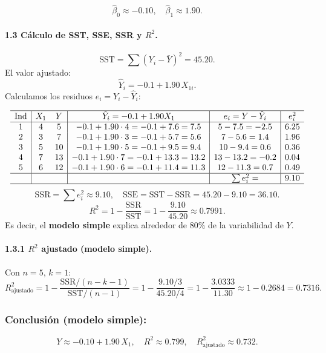 \documentclass[10pt,a4paper]{article}
\begin{document}
\begin{enumerate}
\[
\boxed{
\widehat{\beta}_0 \approx -0.10,
\quad
\widehat{\beta}_1 \approx 1.90.
}
\]

\paragraph{1.3 C\'alculo de SST, SSE, SSR y $R^2$.}

\[
\text{SST}
= \sum (Y_i - \bar{Y})^2
= 45.20.
\]
El valor ajustado: 
\[
\hat{Y}_i
= -0.1 +1.90\,X_{1i}.
\]
Calculamos los residuos $e_i = Y_i - \hat{Y}_i$:

\[
\begin{array}{c|cc|c|c|c}
\hline
\text{Ind} & X_1 & Y 
& \hat{Y}_i = -0.1 +1.90X_1
& e_i= Y-\hat{Y}_i
& e_i^2
\\\hline
1 & 4 & 5 
& -0.1 +1.90\cdot4 =-0.1 +7.6=7.5
& 5-7.5=-2.5
& 6.25
\\
2 & 3 &7
& -0.1 +1.90\cdot3 =-0.1 +5.7=5.6
& 7-5.6=1.4
& 1.96
\\
3 & 5 &10
& -0.1 +1.90\cdot5 =-0.1 +9.5=9.4
& 10-9.4=0.6
& 0.36
\\
4 & 7 &13
& -0.1 +1.90\cdot7 =-0.1 +13.3=13.2
& 13-13.2=-0.2
& 0.04
\\
5 & 6 &12
& -0.1 +1.90\cdot6 =-0.1 +11.4=11.3
& 12-11.3=0.7
& 0.49
\\
\hline
& & & & \sum e_i^2= & 9.10
\\\hline
\end{array}
\]
\[
\text{SSR} = \sum e_i^2 \approx 9.10,
\quad
\text{SSE} = \text{SST} - \text{SSR} = 45.20 -9.10=36.10.
\]
\[
R^2
= 1 - \frac{\text{SSR}}{\text{SST}}
= 1 - \frac{9.10}{45.20}
\approx 0.7991.
\]
Es decir, el \textbf{modelo simple} explica alrededor de $80\%$ de la variabilidad de $Y$.

\paragraph{1.3.1 $R^2$ ajustado (modelo simple).}

Con $n=5$, $k=1$:
\[
R_{\text{ajustado}}^2
= 1 - \frac{\text{SSR}/(n - k -1)}{\text{SST}/(n-1)}
= 1 - \frac{9.10/3}{45.20/4}
= 1 - \frac{3.0333}{11.30}
\approx 1 -0.2684
= 0.7316.
\]

\subsubsection*{Conclusi\'on (modelo simple):}
\[
Y \approx -0.10 +1.90\,X_1,
\quad
R^2 \approx 0.799,
\quad
R_{\text{ajustado}}^2 \approx 0.732.
\]


\end{enumerate}
\end{document}
